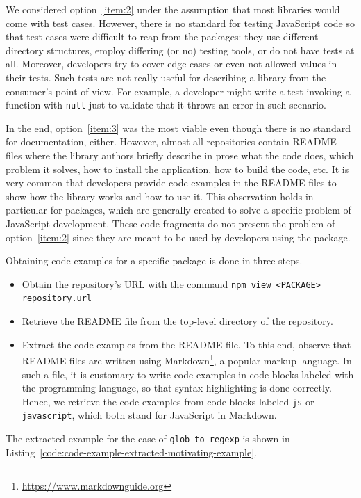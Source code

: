\documentclass[a4paper,english,cleveref, autoref]{lipics-v2019}
\newcommand{\coderef}[1]{Listing~\ref{#1}}
\begin{document}
We considered option~\ref{item:2} under the assumption that most
libraries would come with test cases. However, there is no standard
for testing JavaScript code so that test cases were difficult to reap
from the \NPM{} packages: they use different directory structures,
employ differing (or no) testing tools, or do not have tests
at all. Moreover, developers try to cover edge cases or even not allowed values in their tests. Such tests are not really useful for describing a library from the consumer's point of view. For example, a developer might write a test invoking a function with \texttt{null} just to validate that it throws an error in such scenario.

In the end, option~\ref{item:3} was the most viable even though there
is no standard for documentation, either. However, almost all repositories
contain README files where the library authors briefly describe in prose what
the code does, which problem it solves, how to install the
application, how to build the code, etc. It is very common that
developers provide code examples in the README files to show how the
library works and how to use it. This observation holds in particular
for \NPM{} packages, which are generally created to solve a specific
problem of JavaScript development. These code fragments do not present the problem of option~\ref{item:2} since they are meant to be used by developers using the package.


Obtaining code examples for a specific \NPM{} package is done in three steps.
\begin{itemize}
\item Obtain the  repository's URL with the command
  \texttt{npm view <PACKAGE> repository.url}

\item Retrieve the README file from the top-level directory of the repository.

\item Extract the code examples from the README file. To this end,
  observe that README files are
  written using Markdown\footnote{\url{https://www.markdownguide.org}}, a
  popular markup language. In such a file, it is customary to write
  code examples in code blocks labeled with the programming
  language, so that syntax highlighting is done correctly. Hence, we
  retrieve the code examples from code blocks labeled \texttt{js} or
  \texttt{javascript}, which both stand for JavaScript in
  Markdown.
\end{itemize}

The extracted example for the case of \texttt{glob-to-regexp} is shown in \coderef{code:code-example-extracted-motivating-example}.
\end{document}
